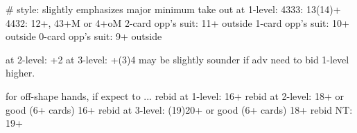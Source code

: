 # style: slightly emphasizes major
minimum take out at 1-level:
4333: 13(14)+
4432: 12+, 43+M or 4+oM
2-card opp's suit: 11+ outside
1-card opp's suit: 10+ outside
0-card opp's suit: 9+ outside

at 2-level: +2
at 3-level: +(3)4
may be slightly sounder if adv need to bid 1-level higher.

for off-shape hands, if expect to ...
rebid at 1-level: 16+
rebid at 2-level: 18+ or good (6+ cards) 16+
rebid at 3-level: (19)20+ or good (6+ cards) 18+
rebid NT: 19+